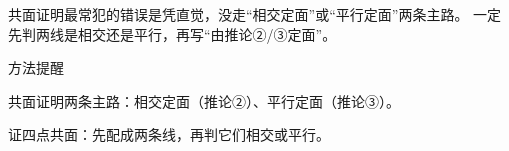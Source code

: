 \documentclass{exam-zh}
\begin{document}
\begin{eduMistakeBox}
共面证明最常犯的错误是凭直觉，没走“相交定面”或“平行定面”两条主路。
一定先判两线是相交还是平行，再写“由推论②/③定面”。
\end{eduMistakeBox}




\begin{eduSummaryBlock}{\eduIconPin}{方法提醒}
\begin{eduBulletList}
  \item 共面证明两条主路：相交定面（推论②）、平行定面（推论③）。  \item 证四点共面：先配成两条线，再判它们相交或平行。\end{eduBulletList}
\end{eduSummaryBlock}
\end{document}
